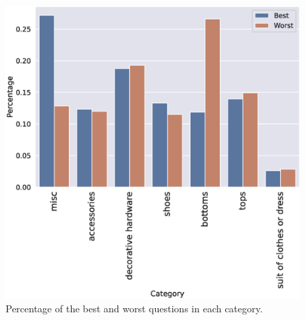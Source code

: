 \begin{figure}
  \centering
  \includegraphics[width=\linewidth]{figures/category_stats_long.eps}
  \caption{Percentage of the best and worst questions in each category.}
  \label{category-stats}
\end{figure}

